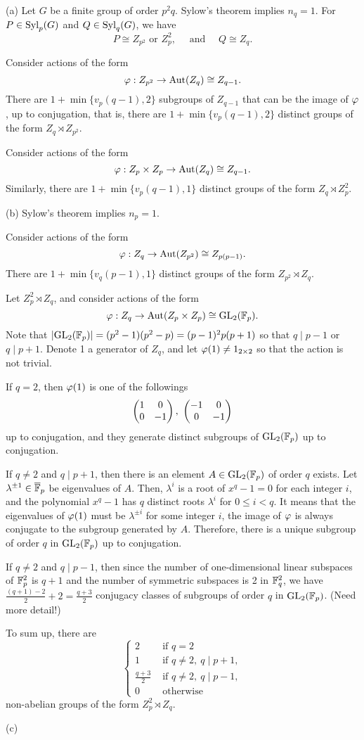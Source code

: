 \documentclass{../note}
\begin{document}
\begin{pf}
(a)
Let $G$ be a finite group of order $p^2q$.
Sylow's theorem implies $n_q=1$.
For $P\in\operatorname{Syl}_p(G)$ and $Q\in\operatorname{Syl}_q(G)$, we have
\[P\cong Z_{p^2}\text{ or }Z_p^2,\quad\text{ and }\quad Q\cong Z_q.\]

Consider actions of the form
\[\varphi:Z_{p^2}\to\operatorname{Aut}(Z_q)\cong Z_{q-1}.\]
There are $1+\min\{v_p(q-1),2\}$ subgroups of $Z_{q-1}$ that can be the image of $\varphi$, up to conjugation, that is, there are $1+\min\{v_p(q-1),2\}$ distinct groups of the form $Z_q\rtimes Z_{p^2}$.

Consider actions of the form
\[\varphi:Z_p\times Z_p\to\operatorname{Aut}(Z_q)\cong Z_{q-1}.\]
Similarly, there are $1+\min\{v_p(q-1),1\}$ distinct groups of the form $Z_q\rtimes Z_p^2$.

(b)
Sylow's theorem implies $n_p=1$.

Consider actions of the form
\[\varphi:Z_q\to\operatorname{Aut}(Z_{p^2})\cong Z_{p(p-1)}.\]
There are $1+\min\{v_q(p-1),1\}$ distinct groups of the form $Z_{p^2}\rtimes Z_q$.

Let $Z_p^2\rtimes Z_q$, and consider actions of the form
\[\varphi:Z_q\to\operatorname{Aut}(Z_p\times Z_p)\cong\mathrm{GL}_2(\mathbb{F}_p).\]
Note that $|\mathrm{GL}_2(\mathbb{F}_p)|=(p^2-1)(p^2-p)=(p-1)^2p(p+1)$ so that $q\mid p-1$ or $q\mid p+1$.
Denote 1 a generator of $Z_q$, and let $\varphi(1)\ne1_{2\times2}$ so that the action is not trivial.

If $q=2$, then $\varphi(1)$ is one of the followings
\[\mat{1&0\\0&-1},\ \mat{-1&0\\0&-1}\]
up to conjugation, and they generate distinct subgroups of $\mathrm{GL}_2(\mathbb{F}_p)$ up to conjugation.

If $q\ne2$ and $q\mid p+1$, then there is an element $A\in\mathrm{GL}_2(\mathbb{F}_p)$ of order $q$ exists.
Let $\lambda^{\pm1}\in\overline{\mathbb{F}}_p$ be eigenvalues of $A$.
Then, $\lambda^i$ is a root of $x^q-1=0$ for each integer $i$, and the polynomial $x^q-1$ has $q$ distinct roots $\lambda^i$ for $0\le i<q$.
It means that the eigenvalues of $\varphi(1)$ must be $\lambda^{\pm i}$ for some integer $i$, the image of $\varphi$ is always conjugate to the subgroup generated by $A$.
Therefore, there is a unique subgroup of order $q$ in $\mathrm{GL}_2(\mathbb{F}_p)$ up to conjugation.

If $q\ne2$ and $q\mid p-1$, then since the number of one-dimensional linear subspaces of $\mathbb{F}_p^2$ is $q+1$ and the number of symmetric subspaces is 2 in $\mathbb{F}_q^2$, we have $\frac{(q+1)-2}2+2=\frac{q+3}2$ conjugacy classes of subgroups of order $q$ in $\mathrm{GL}_2(\mathbb{F}_p)$. (Need more detail!)

To sum up, there are
\[\begin{cases}
2&\text{ if }q=2\\
1&\text{ if }q\ne2,\ q\mid p+1,\\
\frac{q+3}2&\text{ if }q\ne2,\ q\mid p-1,\\
0&\text{ otherwise }\end{cases}\]
non-abelian groups of the form $Z_p^2\rtimes Z_q$.


(c)

\end{pf}
\end{document}
